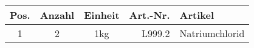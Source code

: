 \begin{longtable}{cccrX}
Pos. & Anzahl & Einheit & Art.-Nr. & Artikel\\
\endhead
\hline

1 & 2 & 1kg & L999.2 & Natriumchlorid\\

\end{longtable}